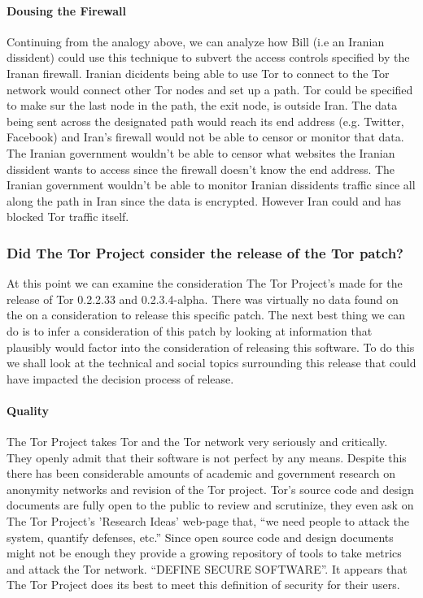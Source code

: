 \documentclass[11pt]{article}
\begin{document}
\begin{multicols}{2}
\paragraph{Dousing the Firewall}

Continuing from the analogy above, we can analyze how Bill (i.e an Iranian
dissident) could use this technique to subvert the access controls specified by
the Iranan firewall. Iranian dicidents being able to use Tor to connect to the
Tor network would connect other Tor nodes and set up a path. Tor could be
specified to make sur the last node in the path, the exit node, is outside Iran.
\cite{Tor:SpecificExitNode, Tor:FAQ} The data being sent across the designated
path would reach its end address (e.g.  Twitter, Facebook) and Iran's firewall
would not be able to censor or monitor that data. The Iranian government
wouldn't be able to censor what websites the Iranian dissident wants to access
since the firewall doesn't know the end address. The Iranian government wouldn't
be able to monitor Iranian dissidents traffic since all along the path in Iran
since the data is encrypted.  However Iran could and has blocked Tor traffic
itself.

\subsubsection{Did The Tor Project consider the release of the Tor patch?} 

At this point we can examine the consideration The Tor Project's made for the
release of Tor 0.2.2.33 and 0.2.3.4-alpha. There was virtually no data found on
the on a consideration to release this specific patch. The next best thing we
can do is to infer a consideration of this patch by looking at information that
plausibly would factor into the consideration of releasing this software. To do
this we shall look at the technical and social topics surrounding this release
that could have impacted the decision process of release.

\paragraph{Quality}

The Tor Project takes Tor and the Tor network very seriously and critically.
They openly admit that their software is not perfect by any means. Despite this
there has been considerable amounts of academic and government research on
anonymity networks and revision of the Tor project. \cite{Tor:ResearchPapers}
Tor's source code and design documents are fully open to the public to review
and scrutinize, they even ask on The Tor Project's 'Research Ideas' web-page
that, ``we need people to attack the system, quantify defenses, etc.''
\cite{Tor:ResearchIdeas, Tor:2011} Since open source code and design documents
might not be enough  they provide a growing repository of tools to take metrics
and attack the Tor network. \cite{Tor:ResearchHome} ``DEFINE SECURE SOFTWARE''.
It appears that The Tor Project does its best to meet this definition of
security for their users.  


\end{multicols}
\end{document}
